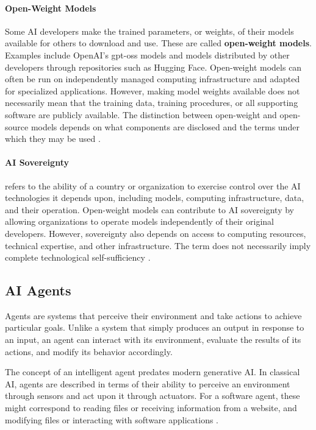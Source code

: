 \documentclass[11pt]{article}
\begin{document}
\paragraph{Open-Weight Models}
Some AI developers make the trained parameters, or weights, of their models available for others to download and use. These are called \textbf{open-weight models}. Examples include OpenAI's gpt-oss models and models distributed by other developers through repositories such as Hugging Face. Open-weight models can often be run on independently managed computing infrastructure and adapted for specialized applications. However, making model weights available does not necessarily mean that the training data, training procedures, or all supporting software are publicly available. The distinction between open-weight and open-source models depends on what components are disclosed and the terms under which they may be used \citep{OpenAI2025GPTOSS}.


\paragraph{AI Sovereignty} refers to the ability of a country or organization to exercise control over the AI technologies it depends upon, including models, computing infrastructure, data, and their operation. Open-weight models can contribute to AI sovereignty by allowing organizations to operate models independently of their original developers. However, sovereignty also depends on access to computing resources, technical expertise, and other infrastructure. The term does not necessarily imply complete technological self-sufficiency \citep{Brookings2026Sovereignty}.


\subsection{AI Agents}
Agents are systems that perceive their environment and take actions
to achieve particular goals. Unlike a system that simply produces
an output in response to an input, an agent can interact with its
environment, evaluate the results of its actions, and modify its
behavior accordingly.

The concept of an intelligent agent predates modern
generative AI. In classical AI, agents are described in
terms of their ability to perceive an environment through
sensors and act upon it through actuators. For a software
agent, these might correspond to reading files or receiving
information from a website, and modifying files or
interacting with software applications
\citep{RussellNorvig2021}.
\end{document}

